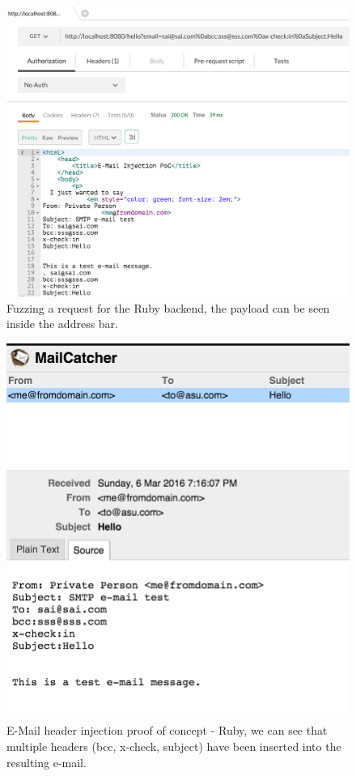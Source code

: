 \begin{figure}[!htbp]
	\centering
	\includegraphics[width=\linewidth]{System/EMI_Postman_Ruby}
	\caption[]{Fuzzing a request for the Ruby backend, the payload can be seen inside the address bar.}
	\label{fig:postmanruby}
\end{figure}

\begin{figure}[!htbp]
	\centering
	\includegraphics[width=\linewidth]{System/EMI_Mailcatcher_Ruby}
	\caption[]{E-Mail header injection proof of concept - Ruby, we can see that multiple headers (bcc, x-check, subject) have been inserted into the resulting e-mail.}
	\label{fig:mailcatcherruby}
\end{figure}